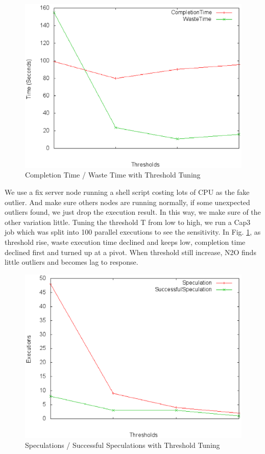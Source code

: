 \begin{figure}
\centering
\includegraphics[width=0.9\columnwidth]{figures/threshold&completiontime.eps}
\caption{Completion Time / Waste Time with Threshold Tuning}
\label{figure:thresholdtuning}
\end{figure}

We use a fix server node running a shell script costing lots of CPU as the fake outlier. And make sure others nodes are running normally, if some unexpected outliers found, we just drop the execution result. In this way, we make sure of the other variation little. Tuning the threshold T from low to high, we run a Cap3 job which was split into 100 parallel executions to see the sensitivity. In Fig. \ref{figure:thresholdtuning}, as threshold rise, waste execution time declined and keeps low, completion time declined first and  turned up at a pivot. When threshold still increase, N2O finds little outliers and becomes lag to response.

\begin{figure}
\centering
\includegraphics[width=0.9\columnwidth]{figures/threshold&speculation.eps}
\caption{Speculations / Successful Speculations with Threshold Tuning}
\label{figure:yetanotherthresholdtuning}
\end{figure}

